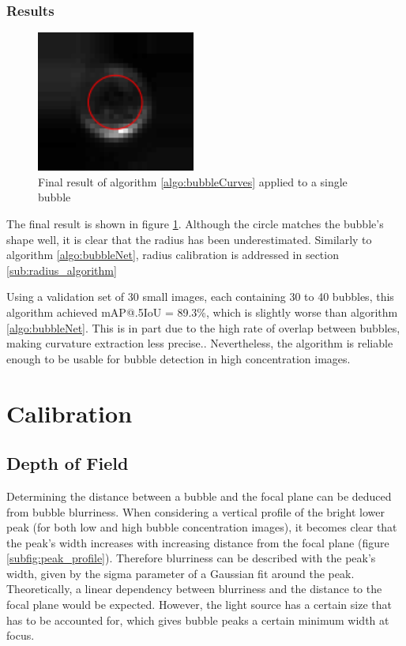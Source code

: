 			\subsubsection{Results}

				\begin{figure}
					\centering
					\includegraphics[scale=1.3]{images/bubbleCurve_final_result.png}
					\caption{Final result of algorithm \ref{algo:bubbleCurves} applied to a single bubble}
					\label{fig:final_result}
				\end{figure}
				
				The final result is shown in figure \ref{fig:final_result}. Although the circle matches the bubble's shape well, it is clear that the radius has been underestimated. Similarly to algorithm \ref{algo:bubbleNet}, radius calibration is addressed in section \ref{sub:radius_algorithm}
				
				Using a validation set of 30 small images, each containing 30 to 40 bubbles, this algorithm achieved mAP@.5IoU = 89.3\%, which is slightly worse than algorithm \ref{algo:bubbleNet}. This is in part due to the high rate of overlap between bubbles, making curvature extraction less precise.. Nevertheless, the algorithm is reliable enough to be usable for bubble detection in high concentration images.
				

	
	
	
	
	\section{Calibration}\label{calibration_algorithm}
		\subsection{Depth of Field}
			Determining the distance between a bubble and the focal plane can be deduced from bubble blurriness. When considering a vertical profile of the bright lower peak (for both low and high bubble concentration images), it becomes clear that the peak's width increases with increasing distance from the focal plane (figure \ref{subfig:peak_profile}). Therefore blurriness can be described with the peak's width, given by the sigma parameter of a Gaussian fit around the peak. Theoretically, a linear dependency between blurriness and the distance to the focal plane would be expected. However, the light source has a certain size that has to be accounted for, which gives bubble peaks a certain minimum width at focus. 
			
